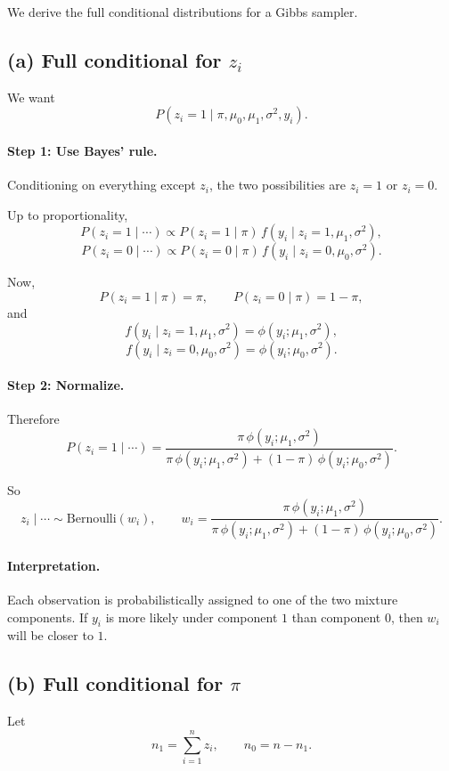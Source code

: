 \documentclass[11pt]{article}
\begin{document}
We derive the full conditional distributions for a Gibbs sampler.

\subsection*{(a) Full conditional for $z_i$}

We want
\[
P(z_i=1\mid \pi,\mu_0,\mu_1,\sigma^2,y_i).
\]

\paragraph{Step 1: Use Bayes' rule.}

Conditioning on everything except $z_i$, the two possibilities are $z_i=1$ or $z_i=0$.

Up to proportionality,
\[
P(z_i=1\mid \cdots)\propto P(z_i=1\mid \pi)\,f(y_i\mid z_i=1,\mu_1,\sigma^2),
\]
\[
P(z_i=0\mid \cdots)\propto P(z_i=0\mid \pi)\,f(y_i\mid z_i=0,\mu_0,\sigma^2).
\]

Now,
\[
P(z_i=1\mid \pi)=\pi,
\qquad
P(z_i=0\mid \pi)=1-\pi,
\]
and
\[
f(y_i\mid z_i=1,\mu_1,\sigma^2)=\phi(y_i;\mu_1,\sigma^2),
\]
\[
f(y_i\mid z_i=0,\mu_0,\sigma^2)=\phi(y_i;\mu_0,\sigma^2).
\]

\paragraph{Step 2: Normalize.}

Therefore
\[
P(z_i=1\mid \cdots)
=
\frac{\pi\,\phi(y_i;\mu_1,\sigma^2)}
{\pi\,\phi(y_i;\mu_1,\sigma^2)+(1-\pi)\,\phi(y_i;\mu_0,\sigma^2)}.
\]

So
\[
\boxed{
z_i\mid \cdots \sim \text{Bernoulli}(w_i),
\qquad
w_i=
\frac{\pi\,\phi(y_i;\mu_1,\sigma^2)}
{\pi\,\phi(y_i;\mu_1,\sigma^2)+(1-\pi)\,\phi(y_i;\mu_0,\sigma^2)}.
}
\]

\paragraph{Interpretation.}  
Each observation is probabilistically assigned to one of the two mixture components.
If $y_i$ is more likely under component $1$ than component $0$, then $w_i$ will be closer to $1$.

\subsection*{(b) Full conditional for $\pi$}

Let
\[
n_1=\sum_{i=1}^n z_i,
\qquad
n_0=n-n_1.
\]
\end{document}
